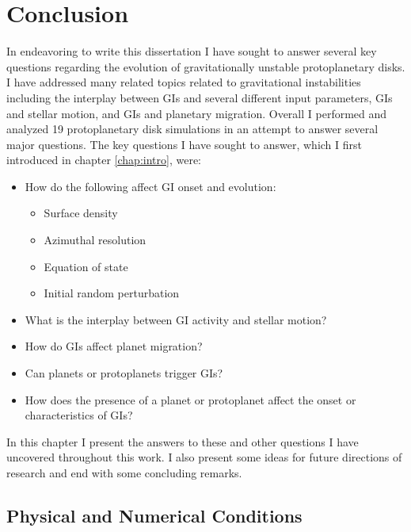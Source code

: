 \chapter[Conclusion]{Conclusion} \label{chap:conclusion}
\thispagestyle{plain}
In endeavoring to write this dissertation I have sought to answer several key questions regarding the evolution of gravitationally unstable protoplanetary disks. I have addressed many related topics related to gravitational instabilities including the interplay between GIs and several different input parameters, GIs and stellar motion, and GIs and planetary migration. Overall I performed and analyzed 19 protoplanetary disk simulations in an attempt to answer several major questions. The key questions I have sought to answer, which I first introduced in chapter \ref{chap:intro}, were:
\begin{itemize}
\item How do the following affect GI onset and evolution:
\begin{itemize}
\item Surface density
\item Azimuthal resolution
\item Equation of state
\item Initial random perturbation
\end{itemize}
\item What is the interplay between GI activity and stellar motion?
\item How do GIs affect planet migration?
\item Can planets or protoplanets trigger GIs?
\item How does the presence of a planet or protoplanet affect the onset or characteristics of GIs? 
\end{itemize}

In this chapter I present the answers to these and other questions I have uncovered throughout this work. I also present some ideas for future directions of research and end with some concluding remarks.

\section{Physical and Numerical Conditions}

